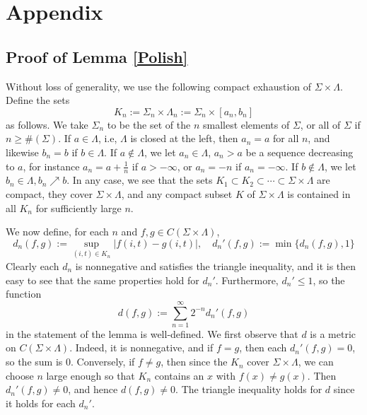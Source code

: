%

\section{Appendix}\label{Appendix1}

\subsection{Proof of Lemma \ref{Polish}}

Without loss of generality, we use the following compact exhaustion of $\Sigma\times\Lambda$. Define the sets
\[
K_n := \Sigma_n \times \Lambda_n := \Sigma_n \times [a_n,b_n]
\]
as follows. We take $\Sigma_n$ to be the set of the $n$ smallest elements of $\Sigma$, or all of $\Sigma$ if $n\geq \#(\Sigma)$. If $a\in\Lambda$, i.e, $\Lambda$ is closed at the left, then $a_n=a$ for all $n$, and likewise $b_n=b$ if $b\in\Lambda$. If $a\notin\Lambda$, we let $a_n\in\Lambda$, $a_n>a$ be a sequence decreasing to $a$, for instance $a_n=a+\frac{1}{n}$ if $a>-\infty$, or $a_n=-n$ if $a_n=-\infty$. If $b\notin\Lambda$, we let $b_n\in\Lambda, b_n\nearrow b$. In any case, we see that the sets $K_1\subset K_2\subset\cdots\subset\Sigma\times\Lambda$ are compact, they cover $\Sigma\times\Lambda$, and any compact subset $K$ of $\Sigma\times\Lambda$ is contained in all $K_n$ for sufficiently large $n$.

We now define, for each $n$ and $f,g\in C(\Sigma\times\Lambda)$,
\[
d_n(f,g) := \sup_{(i,t)\in K_n} |f(i,t)-g(i,t)|,\quad d_n'(f,g) := \min\{d_n(f,g), 1\} 
\]
Clearly each $d_n$ is nonnegative and satisfies the triangle inequality, and it is then easy to see that the same properties hold for $d_n'$. Furthermore, $d_n'\leq 1$, so the function
\[
d(f,g) := \sum_{n=1}^\infty 2^{-n} d_n'(f,g)
\]
in the statement of the lemma is well-defined. We first observe that $d$ is a metric on $C(\Sigma\times\Lambda)$. Indeed, it is nonnegative, and if $f=g$, then each $d_n'(f,g)=0$, so the sum is 0. Conversely, if $f\neq g$, then since the $K_n$ cover $\Sigma\times\Lambda$, we can choose $n$ large enough so that $K_n$ contains an $x$ with $f(x)\neq g(x)$. Then $d_n'(f,g)\neq 0$, and hence $d(f,g)\neq 0$. The triangle inequality holds for $d$ since it holds for each $d_n'$.

